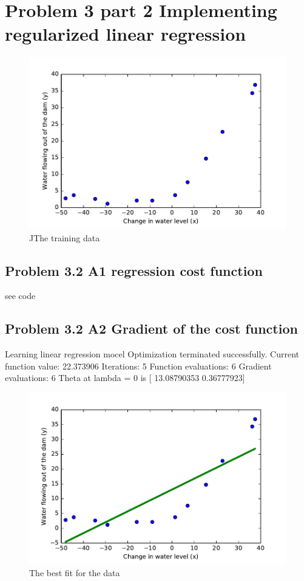 \documentclass[pdftex,11pt]{article}
\begin{document}
\section{Problem 3 part 2 Implementing regularized linear regression}
\begin{figure}[H]
  \caption{JThe training data}
  \centering
    \includegraphics[scale=1]{fig6.pdf}
\end{figure}

\subsection{Problem 3.2 A1 regression cost function }
see code


\subsection{Problem 3.2 A2 Gradient of the cost function }
Learning linear regression mocel
Optimization terminated successfully.
         Current function value: 22.373906
         Iterations: 5
         Function evaluations: 6
         Gradient evaluations: 6
Theta at lambda = 0 is  [ 13.08790353   0.36777923]

\begin{figure}[H]
  \caption{The best fit for the data}
  \centering
    \includegraphics[scale=1]{fig7.pdf}
\end{figure}
\end{document}
